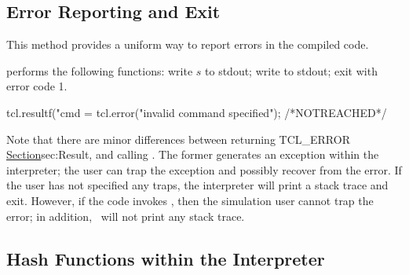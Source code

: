 \subsection{Error Reporting and Exit}
\label{sec:ErrorReporting}

This method provides a uniform way to report errors in the compiled code.
\begin{list}{\textbullet}{}
\item {}
performs the following functions:
write $s$ to stdout; write  to stdout;
exit with error code 1.
\end{list}
\begin{program}
        tcl.resultf("cmd = %
        tcl.error("invalid command specified");
        /*NOTREACHED*/
\end{program}

Note that
there are minor differences between returning TCL\_ERROR
\href{as we did in the previous subsection}{Section}{sec:Result},
and calling .
The former generates an exception within the interpreter;
the user can trap the exception and possibly recover from the error.
If the user has not specified any traps, 
the interpreter will print a stack trace and exit.
However, if the code invokes ,
then the simulation user cannot trap the error;
in addition, \ns\ will not print any stack trace.

\subsection{Hash Functions within the Interpreter}
\label{sec:HashTables}

